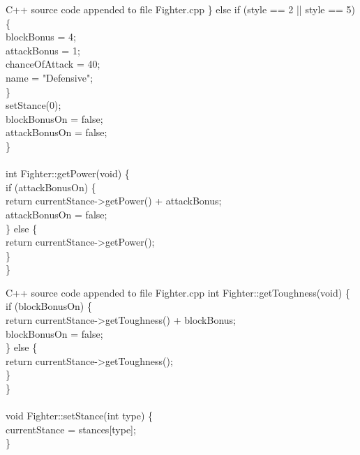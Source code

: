 \documentclass{article}
\begin{document}
\begin{GFT}{C++ source code appended to file Fighter.cpp}
\+    \} else if (style == 2 || style == 5) \{\\
\+        blockBonus = 4;\\
\+        attackBonus = 1;\\
\+        chanceOfAttack = 40;\\
\+        name = "Defensive";\\
\+    \}\\
\+    setStance(0);\\
\+    blockBonusOn = false;\\
\+    attackBonusOn = false;\\
\+\}\\
\+\\
\+int Fighter::getPower(void) \{\\
\+    if (attackBonusOn) \{\\
\+        return currentStance->getPower() + attackBonus;\\
\+        attackBonusOn = false;\\
\+    \} else \{\\
\+        return currentStance->getPower();\\
\+    \}\\
\+\}\\
\end{GFT}
\clearpage
\begin{GFT}{C++ source code appended to file Fighter.cpp}
\+int Fighter::getToughness(void) \{\\
\+    if (blockBonusOn) \{\\
\+        return currentStance->getToughness() + blockBonus;\\
\+        blockBonusOn = false;\\
\+    \} else \{\\
\+        return currentStance->getToughness();\\
\+    \}\\
\+\}\\
\+\\
\+void Fighter::setStance(int type) \{\\
\+    currentStance = stances[type];\\
\+\}\\
\end{GFT}
\end{document}

